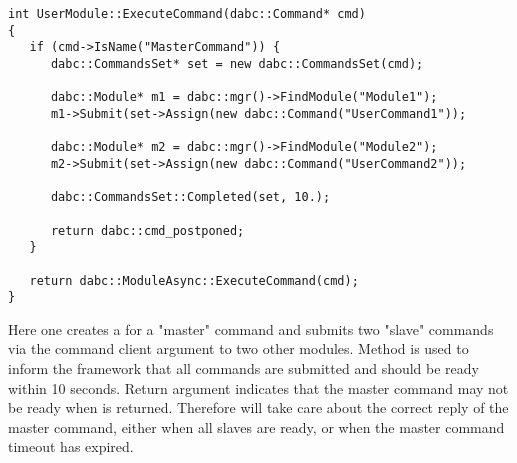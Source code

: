    
\begin{small}
\begin{verbatim}
int UserModule::ExecuteCommand(dabc::Command* cmd)
{
   if (cmd->IsName("MasterCommand")) {
      dabc::CommandsSet* set = new dabc::CommandsSet(cmd);
      
      dabc::Module* m1 = dabc::mgr()->FindModule("Module1");
      m1->Submit(set->Assign(new dabc::Command("UserCommand1")); 

      dabc::Module* m2 = dabc::mgr()->FindModule("Module2");
      m2->Submit(set->Assign(new dabc::Command("UserCommand2")); 

      dabc::CommandsSet::Completed(set, 10.);
      
      return dabc::cmd_postponed;
   } 
      
   return dabc::ModuleAsync::ExecuteCommand(cmd);
}
\end{verbatim}     
\end{small}

Here one creates a  for a "master" command and submits two "slave" commands via the command client argument
to two other modules. Method  is 
used to inform the framework that all commands are submitted and should be ready 
within 10 seconds. Return argument
 indicates that the master command 
may not be ready when  is returned.
Therefore  will take care about the correct reply of 
the master command, either when
all slaves are ready, or when the master command timeout has expired.







